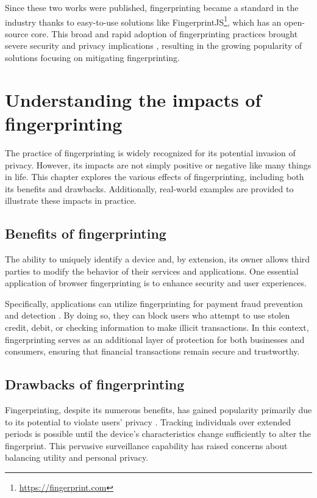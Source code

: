 Since these two works were published, fingerprinting became a standard in the industry thanks to easy-to-use solutions like FingerprintJS\footnote{\url{https://fingerprint.com}}, which has an open-source core. This broad and rapid adoption of fingerprinting practices brought severe security and privacy implications \cite{WP224Fingerprinting}, resulting in the growing popularity of solutions focusing on mitigating fingerprinting.

\section{Understanding the impacts of fingerprinting}
\label{FingerprintingThreatsOpportunities}

The practice of fingerprinting is widely recognized for its potential invasion of privacy. However, its impacts are not simply positive or negative like many things in life. This chapter explores the various effects of fingerprinting, including both its benefits and drawbacks. Additionally, real-world examples are provided to illustrate these impacts in practice.

\subsection{Benefits of fingerprinting}

The ability to uniquely identify a device and, by extension, its owner allows third parties to modify the behavior of their services and applications. One essential application of browser fingerprinting is to enhance security and user experiences.

Specifically, applications can utilize fingerprinting for payment fraud prevention and detection \cite{FingerprintJSUseCases}. By doing so, they can block users who attempt to use stolen credit, debit, or checking information to make illicit transactions. In this context, fingerprinting serves as an additional layer of protection for both businesses and consumers, ensuring that financial transactions remain secure and trustworthy.

\subsection{Drawbacks of fingerprinting}

Fingerprinting, despite its numerous benefits, has gained popularity primarily due to its potential to violate users' privacy \cite{WP224Fingerprinting}. Tracking individuals over extended periods is possible until the device's characteristics change sufficiently to alter the fingerprint. This pervasive surveillance capability has raised concerns about balancing utility and personal privacy.

